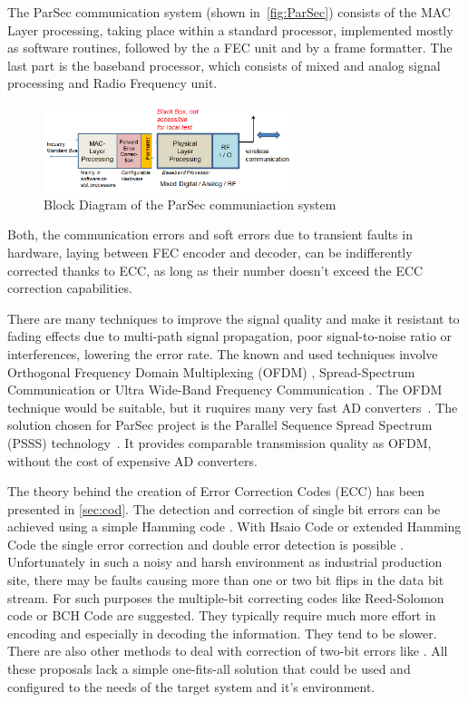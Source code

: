 The ParSec communication system (shown in~\autoref{fig:ParSec}) consists of the MAC Layer processing, taking place within a standard processor, implemented mostly as software routines, followed by the a FEC unit and by a frame formatter. The last part is the baseband processor, which consists of mixed and analog signal processing and Radio Frequency unit. 

\begin{figure}[h]
\centering
\includegraphics[width=0.65\textwidth]{figures/ParSec.png}
\caption{Block Diagram of the ParSec communiaction system}
\label{fig:ParSec}
\end{figure}

Both, the communication errors and soft errors due to transient faults in hardware, laying between FEC encoder and decoder, can be indifferently corrected thanks to ECC, as long as their number doesn't exceed the ECC correction capabilities. 

There are many techniques to improve the signal quality and make it resistant to fading effects due to multi-path signal propagation, poor signal-to-noise ratio or interferences, lowering the error rate. The known and used techniques involve Orthogonal Frequency Domain Multiplexing (OFDM) \cite{book:OFDM,art:OFDM}, Spread-Spectrum Communication \cite{art:spread-spectrum96,art:spread-spectrum97} or Ultra Wide-Band Frequency Communication \cite{book:ultra-wide08,book:ultra-wide04}. The OFDM technique would be suitable, but it ruquires many very fast AD converters~\cite{art:PSSS04}. The solution chosen for ParSec project is the Parallel Sequence Spread Spectrum (PSSS) technology~\cite{art:PSSS15,art:PSSS04,patent}. It provides comparable transmission quality as OFDM, without the cost of expensive AD converters.

The theory behind the creation of Error Correction Codes (ECC) has been presented in \autoref{sec:cod}. The detection and correction of single bit errors can be achieved using a simple Hamming code \cite{art:Hamming}. With Hsaio Code or extended Hamming Code the single error correction and double error detection is possible \cite{book:Fujiwara,art:Hsiao}. Unfortunately in such a noisy and harsh environment as industrial production site, there may be faults causing more than one or two bit flips in the data bit stream. For such purposes the multiple-bit correcting codes like Reed-Solomon code \cite{art:Reed-Solomon} or BCH Code \cite{art:BCH} are suggested. They typically require much more effort in  encoding and especially in decoding the information. They tend to be slower. There are also other methods to deal with correction of two-bit errors like \cite{art:Hosp, art:Varghese}. All these proposals lack a simple one-fits-all solution that could be used and configured to the needs of the target system and it's environment.

